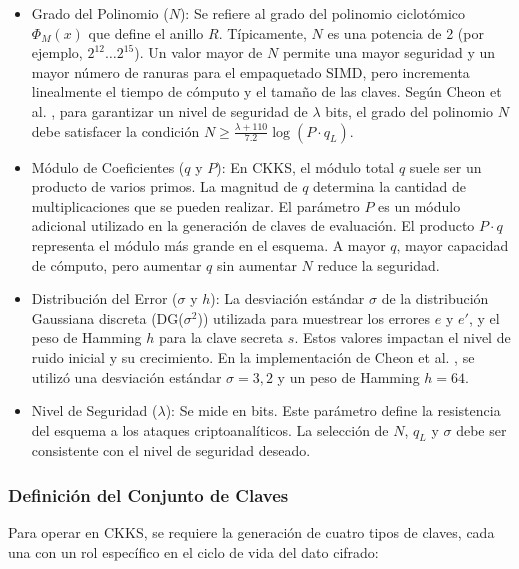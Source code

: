 \begin{itemize}
   \item Grado del Polinomio ($N$): Se refiere al grado del polinomio ciclotómico $\Phi_M(x)$ que define el anillo $R$. Típicamente, $N$ es una potencia de 2 (por ejemplo, $2^{12} \dots 2^{15}$). Un valor mayor de $N$ permite una mayor seguridad y un mayor número de ranuras para el empaquetado SIMD, pero incrementa linealmente el tiempo de cómputo y el tamaño de las claves. Según Cheon et al. \cite{CKKS17}, para garantizar un nivel de seguridad de $\lambda$ bits, el grado del polinomio $N$ debe satisfacer la condición $N \ge \frac{\lambda + 110}{7.2}\log(P \cdot q_L)$.
   
   \item Módulo de Coeficientes ($q$ y $P$): En CKKS, el módulo total $q$ suele ser un producto de varios primos. La magnitud de $q$ determina la cantidad de multiplicaciones que se pueden realizar. El parámetro $P$ es un módulo adicional utilizado en la generación de claves de evaluación. El producto $P \cdot q$ representa el módulo más grande en el esquema. A mayor $q$, mayor capacidad de cómputo, pero aumentar $q$ sin aumentar $N$ reduce la seguridad.
   
   \item Distribución del Error ($\sigma$ y $h$): La desviación estándar $\sigma$ de la distribución Gaussiana discreta (DG($\sigma^2$)) utilizada para muestrear los errores $e$ y $e'$, y el peso de Hamming $h$ para la clave secreta $s$. Estos valores impactan el nivel de ruido inicial y su crecimiento. En la implementación de Cheon et al. \cite{CKKS17}, se utilizó una desviación estándar $\sigma = 3{,}2$ y un peso de Hamming $h = 64$.
   
   \item Nivel de Seguridad ($\lambda$): Se mide en bits. Este parámetro define la resistencia del esquema a los ataques criptoanalíticos. La selección de $N$, $q_L$ y $\sigma$ debe ser consistente con el nivel de seguridad deseado.

\end{itemize}

\subsubsection{Definición del Conjunto de Claves}

Para operar en CKKS, se requiere la generación de cuatro tipos de claves, cada una con un rol específico en el ciclo de vida del dato cifrado:

